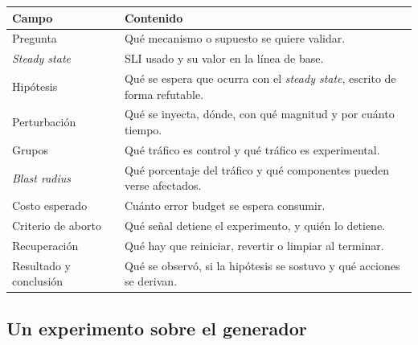\documentclass[variant=apuntes,cover=institutional,mode=screen]{ua-engineering-v6-article}
\begin{document}
\begin{center}
\begin{tabular}{p{}p{}}
\toprule
\textbf{Campo} & \textbf{Contenido} \\
\midrule
Pregunta & Qué mecanismo o supuesto se quiere validar. \\
\emph{Steady state} & SLI usado y su valor en la línea de base. \\
Hipótesis & Qué se espera que ocurra con el \emph{steady state}, escrito de forma refutable. \\
Perturbación & Qué se inyecta, dónde, con qué magnitud y por cuánto tiempo. \\
Grupos & Qué tráfico es control y qué tráfico es experimental. \\
\emph{Blast radius} & Qué porcentaje del tráfico y qué componentes pueden verse afectados. \\
Costo esperado & Cuánto error budget se espera consumir. \\
Criterio de aborto & Qué señal detiene el experimento, y quién lo detiene. \\
Recuperación & Qué hay que reiniciar, revertir o limpiar al terminar. \\
Resultado y conclusión & Qué se observó, si la hipótesis se sostuvo y qué acciones se derivan. \\
\bottomrule
\end{tabular}
\end{center}

\subsection{Un experimento sobre el generador}\label{sec:experimento-generador}
\end{document}
